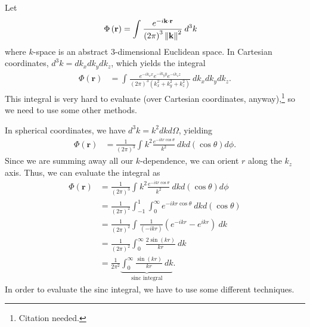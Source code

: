 \documentclass[10pt]{mypackage}
\begin{document}
\begin{example}
  Let
  \begin{align*}
    \Phi\left(\mathbf{r}\right) &= \int_{}^{} \frac{e^{-i\mathbf{k}\cdot\mathbf{r}}}{\left(2\pi\right)^3\norm{\mathbf{k}}^2}\:d^{3}k
  \end{align*}
  where $k$-space is an abstract $3$-dimensional Euclidean space. In Cartesian coordinates, $d^3k = dk_x dk_y dk_z$, which yields the integral
  \begin{align*}
    \Phi\left(\mathbf{r}\right) &= \int_{}^{} \frac{e^{-ik_x x}e^{-ik_y y}e^{-ik_z z}}{\left(2\pi\right)^3 \left(k_x^2 + k_y^2 + k_z^2\right)}\:dk_x dk_y dk_z.
  \end{align*}
  This integral is very hard to evaluate (over Cartesian coordinates, anyway),\footnote{Citation needed.} so we need to use some other methods.\newline

  In spherical coordinates, we have $d^3 k = k^2 dk d\Omega$, yielding
  \begin{align*}
    \Phi\left(\mathbf{r}\right) &= \frac{1}{\left(2\pi\right)^3}\int_{}^{} k^2\frac{e^{-ikr\cos\theta}}{k^2}\:dkd\left(\cos \theta\right)d\phi.
  \end{align*}
  Since we are summing away all our $k$-dependence, we can orient $r$ along the $k_z$ axis. Thus, we can evaluate the integral as
  \begin{align*}
    \Phi\left(\mathbf{r}\right) &= \frac{1}{\left(2\pi\right)^3}\int_{}^{} k^2\frac{e^{-ikr\cos\theta}}{k^2}\:dkd\left(\cos \theta\right)d\phi\\
                                &= \frac{1}{\left(2\pi\right)^{2}}\int_{-1}^{1}\int_{0}^{\infty} e^{-ikr\cos\theta} \:dk d(\cos\theta)\\
                                &= \frac{1}{\left(2\pi\right)^2}\int_{}^{} \frac{1}{\left(-ikr\right)}\left(e^{-ikr} - e^{ikr}\right)\:dk\\
                                &= \frac{1}{\left(2\pi\right)^2}\int_{0}^{\infty}\frac{2\sin(kr)}{kr} \:dk\\
                                &= \frac{1}{2\pi^2}\underbrace{\int_{0}^{\infty} \frac{\sin(kr)}{kr}\:dk}_{\text{sinc integral}}.
  \end{align*}
  In order to evaluate the sinc integral, we have to use some different techniques.
\end{example}
\end{document}
